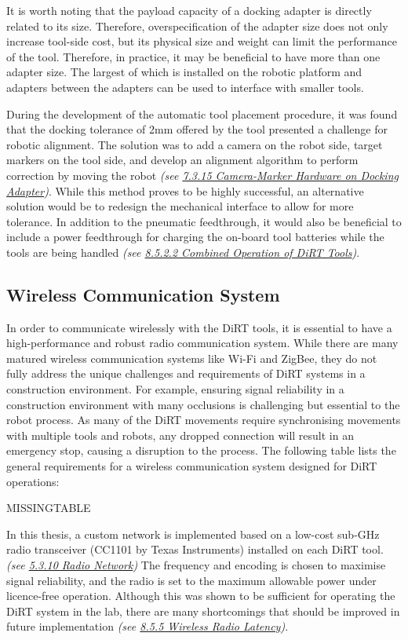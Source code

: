 It is worth noting that the payload capacity of a docking adapter is directly related to its size. Therefore, overspecification of the adapter size does not only increase tool-side cost, but its physical size and weight can limit the performance of the tool. Therefore, in practice, it may be beneficial to have more than one adapter size. The largest of which is installed on the robotic platform and adapters between the adapters can be used to interface with smaller tools.

During the development of the automatic tool placement procedure, it was found that the docking tolerance of 2mm offered by the tool presented a challenge for robotic alignment. The solution was to add a camera on the robot side, target markers on the tool side, and develop an alignment algorithm to perform correction by moving the robot \textit{(see \ul{7.3.15 Camera-Marker Hardware on Docking Adapter})}. While this method proves to be highly successful, an alternative solution would be to redesign the mechanical interface to allow for more tolerance. In addition to the pneumatic feedthrough, it would also be beneficial to include a power feedthrough for charging the on-board tool batteries while the tools are being handled \textit{(see \ul{8.5.2.2 Combined Operation of DiRT Tools})}. 

\subsection{Wireless Communication System}
\label{subsection:discussion_wireless_communication_system}

In order to communicate wirelessly with the DiRT tools, it is essential to have a high-performance and robust radio communication system. While there are many matured wireless communication systems like Wi-Fi and ZigBee, they do not fully address the unique challenges and requirements of DiRT systems in a construction environment. For example, ensuring signal reliability in a construction environment with many occlusions is challenging but essential to the robot process. As many of the DiRT movements require synchronising movements with multiple tools and robots, any dropped connection will result in an emergency stop, causing a disruption to the process. The following table lists the general requirements for a wireless communication system designed for DiRT operations:

MISSINGTABLE

In this thesis, a custom network is implemented based on a low-cost sub-GHz radio transceiver (CC1101 by Texas Instruments) installed on each DiRT tool. \textit{(see \ul{5.3.10 Radio Network}) }The frequency and encoding is chosen to maximise signal reliability, and the radio is set to the maximum allowable power under licence-free operation. Although this was shown to be sufficient for operating the DiRT system in the lab, there are many shortcomings that should be improved in future implementation \textit{(see \ul{8.5.5 Wireless Radio Latency})}.


